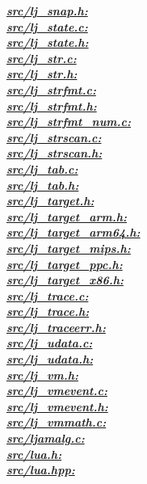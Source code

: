 \underline{\textbf{\emph{src/lj\_snap.h:}}}\\
\underline{\textbf{\emph{src/lj\_state.c:}}}\\
\underline{\textbf{\emph{src/lj\_state.h:}}}\\
\underline{\textbf{\emph{src/lj\_str.c:}}}\\
\underline{\textbf{\emph{src/lj\_str.h:}}}\\
\underline{\textbf{\emph{src/lj\_strfmt.c:}}}\\
\underline{\textbf{\emph{src/lj\_strfmt.h:}}}\\
\underline{\textbf{\emph{src/lj\_strfmt\_num.c:}}}\\
\underline{\textbf{\emph{src/lj\_strscan.c:}}}\\
\underline{\textbf{\emph{src/lj\_strscan.h:}}}\\
\underline{\textbf{\emph{src/lj\_tab.c:}}}\\
\underline{\textbf{\emph{src/lj\_tab.h:}}}\\
\underline{\textbf{\emph{src/lj\_target.h:}}}\\
\underline{\textbf{\emph{src/lj\_target\_arm.h:}}}\\
\underline{\textbf{\emph{src/lj\_target\_arm64.h:}}}\\
\underline{\textbf{\emph{src/lj\_target\_mips.h:}}}\\
\underline{\textbf{\emph{src/lj\_target\_ppc.h:}}}\\
\underline{\textbf{\emph{src/lj\_target\_x86.h:}}}\\
\underline{\textbf{\emph{src/lj\_trace.c:}}}\\
\underline{\textbf{\emph{src/lj\_trace.h:}}}\\
\underline{\textbf{\emph{src/lj\_traceerr.h:}}}\\
\underline{\textbf{\emph{src/lj\_udata.c:}}}\\
\underline{\textbf{\emph{src/lj\_udata.h:}}}\\
\underline{\textbf{\emph{src/lj\_vm.h:}}}\\
\underline{\textbf{\emph{src/lj\_vmevent.c:}}}\\
\underline{\textbf{\emph{src/lj\_vmevent.h:}}}\\
\underline{\textbf{\emph{src/lj\_vmmath.c:}}}\\
\underline{\textbf{\emph{src/ljamalg.c:}}}\\
\underline{\textbf{\emph{src/lua.h:}}}\\
\underline{\textbf{\emph{src/lua.hpp:}}}\\
